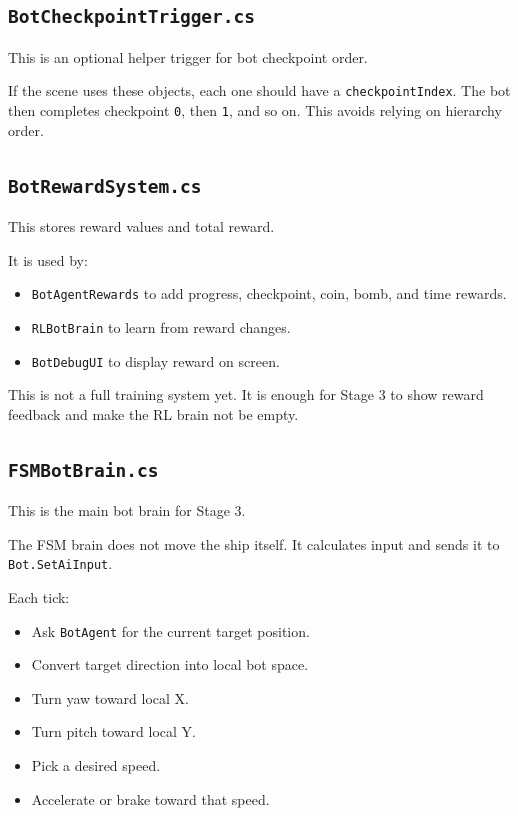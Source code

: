 \documentclass[11pt]{article}
\newcommand{\file}[1]{\texttt{#1}}
\newcommand{\code}[1]{{\footnotesize\texttt{#1}}}
\begin{document}
\subsection{\file{BotCheckpointTrigger.cs}}

This is an optional helper trigger for bot checkpoint order.

If the scene uses these objects, each one should have a \code{checkpointIndex}. The bot then completes checkpoint \code{0}, then \code{1}, and so on. This avoids relying on hierarchy order.

\subsection{\file{BotRewardSystem.cs}}

This stores reward values and total reward.

It is used by:

\begin{itemize}
    \item \code{BotAgentRewards} to add progress, checkpoint, coin, bomb, and time rewards.
    \item \code{RLBotBrain} to learn from reward changes.
    \item \code{BotDebugUI} to display reward on screen.
\end{itemize}

This is not a full training system yet. It is enough for Stage 3 to show reward feedback and make the RL brain not be empty.

\subsection{\file{FSMBotBrain.cs}}

This is the main bot brain for Stage 3.

The FSM brain does not move the ship itself. It calculates input and sends it to \code{Bot.SetAiInput}.

Each tick:

\begin{itemize}
    \item Ask \code{BotAgent} for the current target position.
    \item Convert target direction into local bot space.
    \item Turn yaw toward local X.
    \item Turn pitch toward local Y.
    \item Pick a desired speed.
    \item Accelerate or brake toward that speed.
\end{itemize}
\end{document}
